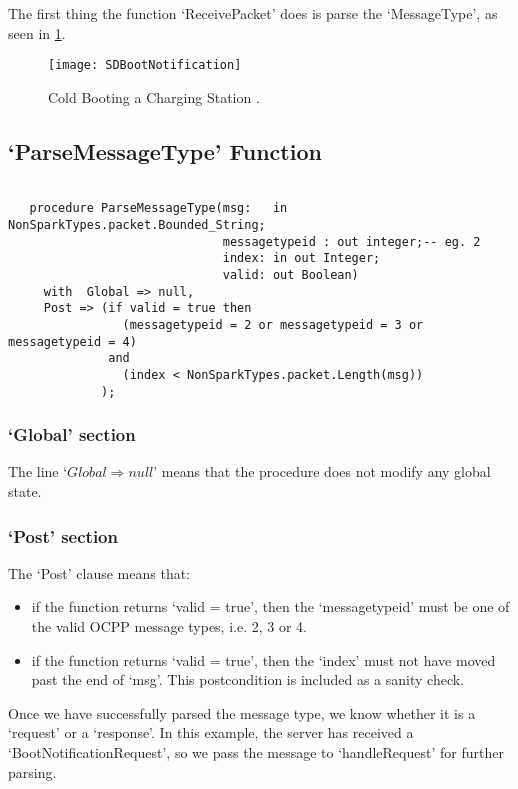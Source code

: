 \documentclass[12pt,openany,a4paper]{book}
\begin{document}
The first thing the function `ReceivePacket' does is parse the `MessageType', as seen in \ref{fig:SDBootNotification}. 

	\begin{center}
		\begin{figure}[H]
			\texttt{[image: SDBootNotification]}
			\caption{Cold Booting a Charging Station \cite{ocpp2b}.}
			\label{fig:SDBootNotification}
		\end{figure}
	\end{center}

\subsection{`ParseMessageType' Function}
\begin{verbatim}

   procedure ParseMessageType(msg:   in  NonSparkTypes.packet.Bounded_String;
                              messagetypeid : out integer;-- eg. 2
                              index: in out Integer;
                              valid: out Boolean)
     with  Global => null,
     Post => (if valid = true then 
                (messagetypeid = 2 or messagetypeid = 3 or messagetypeid = 4)
              and
                (index < NonSparkTypes.packet.Length(msg))
             );
\end{verbatim}
\subsubsection{`Global' section}
The line `$Global \Rightarrow null$' means that the procedure does not modify any global state.
\subsubsection{`Post' section}
The `Post' clause means that:
\begin{itemize}
\item if the function returns `valid = true', then the `messagetypeid' must be one of the valid OCPP message types, i.e. 2, 3 or 4.
\item if the function returns `valid = true', then the `index' must not have moved past the end of `msg'. This postcondition is included as a sanity check. 
\end{itemize}

Once we have successfully parsed the message type, we know whether it is a `request' or a `response'. In this example, the server has received a `BootNotificationRequest', so we pass the message to `handleRequest' for further parsing.
\end{document}
